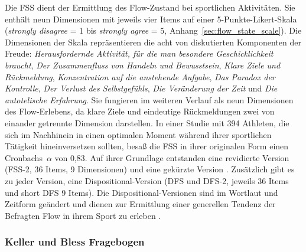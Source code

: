 \label{ssub:flow_state_scale}

Die \ac{FSS} dient der Ermittlung des Flow-Zustand bei sportlichen Aktivitäten. Sie enthält neun Dimensionen mit jeweils vier Items auf einer 5-Punkte-Likert-Skala (\emph{strongly disagree} = 1 bis \emph{strongly agree} = 5, Anhang~\ref{sec:flow_state_scale}). Die Dimensionen der Skala repräsentieren die acht von \citet[S. 73-101]{Csikszentmihalyi1992} diskutierten Komponenten der Freude: \emph{Herausfordernde Aktivität, für die man besondere Geschicklichkeit braucht}, \emph{Der Zusammenfluss von Handeln und Bewusstsein}, \emph{Klare Ziele und Rückmeldung}, \emph{Konzentration auf die anstehende Aufgabe}, \emph{Das Paradox der Kontrolle}, \emph{Der Verlust des Selbstgefühls}, \emph{Die Veränderung der Zeit} und \emph{Die autotelische Erfahrung}. Sie fungieren im weiteren Verlauf als neun Dimensionen des Flow-Erlebens, da klare Ziele und eindeutige Rückmeldungen zwei von einander getrennte Dimension darstellen. In einer Studie mit 394 Athleten, die sich im Nachhinein in einen optimalen Moment während ihrer sportlichen Tätigkeit hineinversetzen sollten, besaß die \ac{FSS} in ihrer originalen Form einen Cronbachs~$\alpha$ von 0,83. Auf ihrer Grundlage entstanden eine revidierte Version (\ac{FSS}-2, 36 Items, 9 Dimensionen) und eine gekürzte Version \citep[short \ac{FSS}-2, 9 Items,][]{Jackson2002, Jackson2008}. Zusätzlich gibt es zu jeder Version, eine Dispositional-Version (\acs{DFS} und \acs{DFS}-2, jeweils 36 Items und short \acs{DFS} 9 Items). Die Dispositional-Versionen sind im Wortlaut und Zeitform geändert und dienen zur Ermittlung einer generellen Tendenz der Befragten Flow in ihrem Sport zu erleben \citep[][S.~356]{Jackson1998}.

\subsubsection{Keller und Bless Fragebogen} 

\label{ssub:keller_und_bless_fragebogen}

